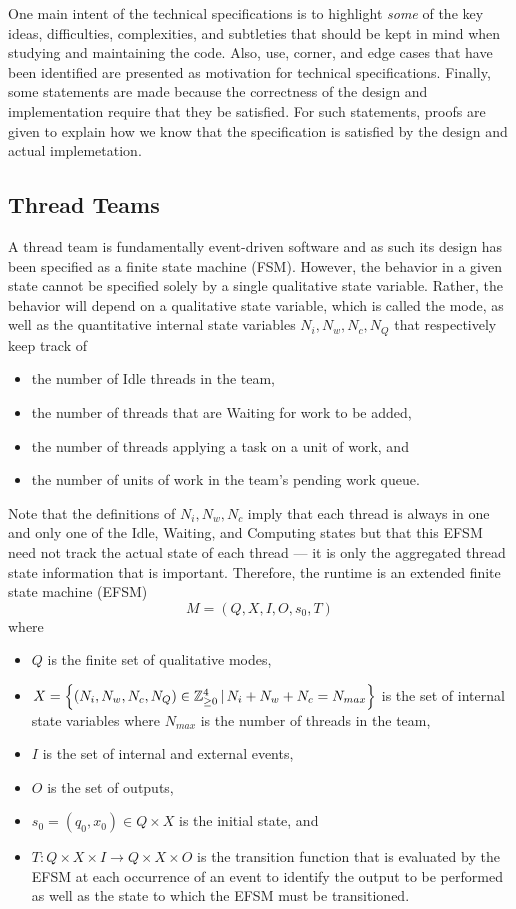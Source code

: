 \documentclass{article}
\newcommand{\Z}                 {{\mathbb Z}}
\begin{document}
One main intent of the technical specifications is to highlight \textit{some} of
the key ideas, difficulties, complexities, and subtleties that should be kept in
mind when studying and maintaining the code.  Also, use, corner, and edge cases
that have been identified are presented as motivation for technical
specifications.  Finally, some statements are made because the correctness of
the design and implementation require that they be satisfied.  For such
statements, proofs are given to explain how we know that the specification is
satisfied by the design and actual implemetation.

\subsection{Thread Teams}
A thread team is fundamentally event-driven software and as such its design has
been specified as a finite state machine (FSM).  However, the behavior in a
given state cannot be specified solely by a single qualitative state variable.
Rather, the behavior will depend on a qualitative state variable, which is
called the mode, as well as the quantitative internal state variables $N_i, N_w,
N_c, N_Q$ that respectively keep track of 
\begin{itemize}
\item{the number of Idle threads in the team,}
\item{the number of threads that are Waiting for work to be added,}
\item{the number of threads applying a task on a unit of work, and}
\item{the number of units of work in the team's pending work queue.}
\end{itemize}
Note that the definitions of $N_i, N_w, N_c$ imply that each thread is
always in one and only one of the Idle, Waiting, and Computing states but that
this EFSM need not track the actual state of each thread --- it is only the
aggregated thread state information that is important.  Therefore, the runtime
is an extended finite state machine (EFSM)
\[
M = (Q, X, I, O, s_0, T)
\]
where
\begin{itemize}
\item{$Q$ is the finite set of qualitative modes,}
\item{$X = \set{(N_i, N_w, N_c, N_Q) \in \Z_{\ge 0}^4\,|\,N_i + N_w + N_c =
N_{max}}$ is the set of internal state variables where $N_{max}$ is the
number of threads in the team,}
\item{$I$ is the set of internal and external events,}
\item{$O$ is the set of outputs,}
\item{$s_0 = (q_0, x_0) \in Q \times X$ is the initial state, and}
\item{$T : Q \times X \times I \to Q \times X \times O$ is the transition
function that is evaluated by the EFSM at each occurrence of an event to
identify the output to be performed as well as the state to which the EFSM must
be transitioned.}
\end{itemize}
\end{document}
